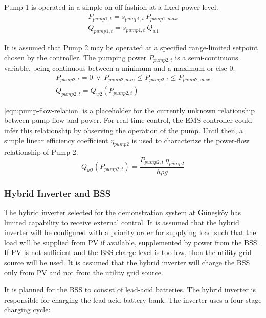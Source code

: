 Pump 1 is operated in a simple on-off fashion at a fixed power level.
%
\begin{gather}
\label{eqn:pump1-power}
P_{pump1,t} = s_{pump1,t} \ P_{pump1,max} \\
\label{eqn:pump1-flow}
Q_{pump1,t} = s_{pump1,t} \ Q_{w1}
\end{gather}

It is assumed that Pump 2 may be operated at a specified range-limited setpoint chosen by the controller. The pumping power $P_{pump2,t}$ is a semi-continuous variable, being continuous between a minimum and a maximum or else 0.
%
\begin{gather}
\label{eqn:pump2-power}
P_{pump2,t} = 0 \ \lor \ P_{pump2,min} \le P_{pump2,t} \le P_{pump2,max} \\
\label{eqn:pump2-flow}
Q_{pump2,t} = Q_{w2}\left( P_{pump2,t} \right)
\end{gather}

\autoref{eqn:pump-flow-relation} is a placeholder for the currently unknown relationship between pump flow and power. For real-time control, the EMS controller could infer this relationship by observing the operation of the pump. Until then, a simple linear efficiency coefficient $\eta_{pump2}$ is used to characterize the power-flow relationship of Pump 2.
%
\begin{equation}
\label{eqn:pump-flow-relation}
 Q_{w2}\left( P_{pump2,t} \right) = \frac{P_{pump2,t} \ \eta_{pump2}}{h \rho g}
\end{equation}

\subsubsection{Hybrid Inverter and BSS}

The hybrid inverter selected for the demonstration system at Güneşköy has limited capability to receive external control. It is assumed that the hybrid inverter will be configured with a priority order for supplying load such that the load will be supplied from PV if available, supplemented by power from the BSS. If PV is not sufficient and the BSS charge level is too low, then the utility grid source will be used. It is assumed that the hybrid inverter will charge the BSS only from PV and not from the utility grid source.

It is planned for the BSS to consist of lead-acid batteries. The hybrid inverter is responsible for charging the lead-acid battery bank. The inverter uses a four-stage charging cycle:

